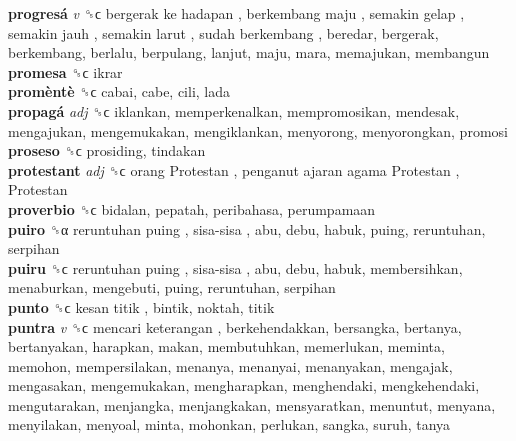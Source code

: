 \textbf{progresá} \emph{v}  ␝ϲ   bergerak ke hadapan ,  berkembang maju ,  semakin gelap ,  semakin jauh ,  semakin larut ,  sudah berkembang , beredar, bergerak, berkembang, berlalu, berpulang, lanjut, maju, mara, memajukan, membangun  \\
\textbf{promesa} ␝ϲ  ikrar  \\
\textbf{promèntè} ␝ϲ  cabai, cabe, cili, lada  \\
\textbf{propagá} \emph{adj}  ␝ϲ  iklankan, memperkenalkan, mempromosikan, mendesak, mengajukan, mengemukakan, mengiklankan, menyorong, menyorongkan, promosi  \\
\textbf{proseso} ␝ϲ  prosiding, tindakan  \\
\textbf{protestant} \emph{adj}  ␝ϲ   orang Protestan ,  penganut ajaran agama Protestan ,  Protestan   \\
\textbf{proverbio} ␝ϲ  bidalan, pepatah, peribahasa, perumpamaan  \\
\textbf{puiro} ␝α   reruntuhan puing ,  sisa-sisa , abu, debu, habuk, puing, reruntuhan, serpihan  \\
\textbf{puiru} ␝ϲ   reruntuhan puing ,  sisa-sisa , abu, debu, habuk, membersihkan, menaburkan, mengebuti, puing, reruntuhan, serpihan  \\
\textbf{punto} ␝ϲ   kesan titik , bintik, noktah, titik  \\
\textbf{puntra} \emph{v}  ␝ϲ   mencari keterangan , berkehendakkan, bersangka, bertanya, bertanyakan, harapkan, makan, membutuhkan, memerlukan, meminta, memohon, mempersilakan, menanya, menanyai, menanyakan, mengajak, mengasakan, mengemukakan, mengharapkan, menghendaki, mengkehendaki, mengutarakan, menjangka, menjangkakan, mensyaratkan, menuntut, menyana, menyilakan, menyoal, minta, mohonkan, perlukan, sangka, suruh, tanya  \\
